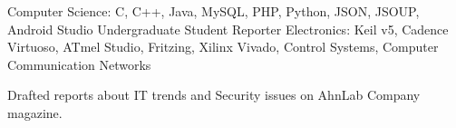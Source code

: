\begin{cventries}
  \cventry
    {}
    {Computer Science: C, C++, Java, MySQL, PHP, Python, JSON, JSOUP, Android Studio}
    {}
    {}
    {
    }
  \cventry
    {Undergraduate Student Reporter}
    {Electronics: Keil v5, Cadence Virtuoso, ATmel Studio, Fritzing, Xilinx Vivado, Control Systems, Computer Communication Networks}
    {}
    {}
    {
      \begin{cvitems}
        \item {Drafted reports about IT trends and Security issues on AhnLab Company magazine.}
      \end{cvitems}
    }
\end{cventries}
